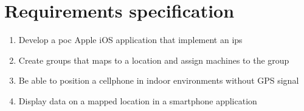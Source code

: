 \chapter{Requirements specification}\label{appendix:requirements}
\begin{enumerate}
	\item\label{req:developeApp}
	Develop a \acrlong{poc} Apple iOS application that implement an \acrlong{ips}

	\item\label{req:createGroups}
	Create groups that maps to a location and assign machines to the group 

	\item\label{req:positionDevice}
	Be able to position a cellphone in indoor environments without GPS signal 

	\item\label{req:displayData}
	Display data on a mapped location in a smartphone application
\end{enumerate}

